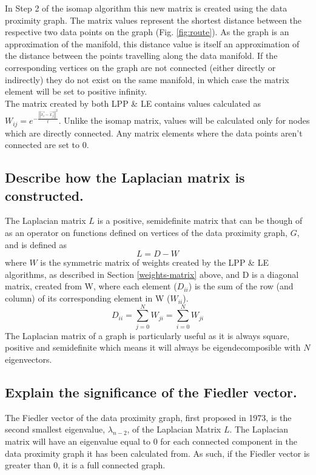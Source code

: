 \documentclass{article}
\begin{document}
In Step 2 of the isomap algorithm this new matrix is created using the data proximity graph. The matrix values represent the shortest distance between the respective two data points on the graph (Fig. \ref{fig:route}). As the graph is an approximation of the manifold, this distance value is itself an approximation of the distance between the points travelling along the data manifold. If the corresponding vertices on the graph are not connected (either directly or indirectly) they do not exist on the same manifold, in which case the matrix element will be set to positive infinity.\\

\label{weights-matrix}
The matrix created by both LPP \& LE contains values calculated as $W_{ij} = e^{-\frac{\left|\left|\vec{x_i} - \vec{x_j}\right|\right|^{2}}{t}}$. Unlike the isomap matrix, values will be calculated only for nodes which are directly connected. Any matrix elements where the data points aren't connected are set to 0.

\subsection{Describe how the Laplacian matrix is constructed.}
\label{laplacian-matrix}
The Laplacian matrix $L$ is a positive, semidefinite matrix that can be though of as an operator on functions defined on vertices of the data proximity graph, $G$, and is defined as
\[L = D - W\]
where $W$ is the symmetric matrix of weights created by the LPP \& LE algorithms, as described in Section \ref{weights-matrix} above, and D is a diagonal matrix, created from W, where each element ($D_{ii}$) is the sum of the row (and column) of its corresponding element in W ($W_{ii}$)\cite{le}. 
$$D_{ii} = \sum_{j=0}^{N} W_{ji} = \sum_{i=0}^{N} W_{ji}$$
The Laplacian matrix of a graph is particularly useful as it is always square, positive and semidefinite which means it will always be eigendecomposible with $N$ eigenvectors.


\subsection{Explain the significance of the Fiedler vector.}
The Fiedler vector of the data proximity graph, first proposed in 1973\cite{fiedler_1973}, is the second smallest eigenvalue, $\lambda_{n-2}$, of the Laplacian Matrix $L$. The Laplacian matrix will have an eigenvalue equal to 0 for each connected component in the data proximity graph it has been calculated from. As such, if the Fiedler vector is greater than 0, it is a full connected graph.\\
\end{document}
